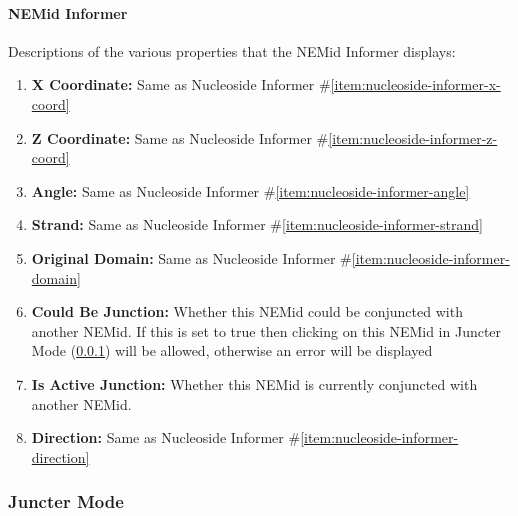 \documentclass[titlepage]{article}
\begin{document}
\paragraph{NEMid Informer}
Descriptions of the various properties that the NEMid Informer displays:
\begin{enumerate}
	\item \textbf{X Coordinate:} Same as Nucleoside Informer \#\ref{item:nucleoside-informer-x-coord}
	
	\item \textbf{Z Coordinate:} Same as Nucleoside Informer \#\ref{item:nucleoside-informer-z-coord}
	
	\item \textbf{Angle:} Same as Nucleoside Informer \#\ref{item:nucleoside-informer-angle}
	
	\item \textbf{Strand:} Same as Nucleoside Informer \#\ref{item:nucleoside-informer-strand}
	
	\item \textbf{Original Domain:} Same as Nucleoside Informer \#\ref{item:nucleoside-informer-domain}
	
	\item \textbf{Could Be Junction:} Whether this NEMid could be conjuncted with another NEMid. If this is set to true then clicking on this NEMid in Juncter Mode (\ref{sect:juncter}) will be allowed, otherwise an error will be displayed
	
	\item \textbf{Is Active Junction:} Whether this NEMid is currently conjuncted with another NEMid. 
	
	\item \textbf{Direction:} Same as Nucleoside Informer \#\ref{item:nucleoside-informer-direction}
\end{enumerate}

\subsubsection{Juncter Mode} \label{sect:juncter}
\end{document}
